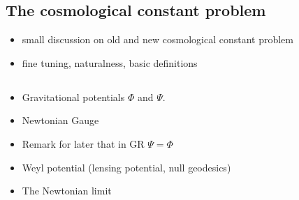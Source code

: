 \subsection{The cosmological constant problem \label{sub:CC-problem}}

\begin{itemize}
\item small discussion on old and new cosmological constant problem
\item fine tuning, naturalness, basic definitions
\end{itemize}

\subsection{}

\begin{itemize}
	\item Gravitational potentials $\Phi$ and $\Psi$.
	\item Newtonian Gauge
	\item Remark for later that in GR $\Psi=\Phi$
	\item Weyl potential (lensing potential, null geodesics)
	\item{The Newtonian limit}
\end{itemize}

%



